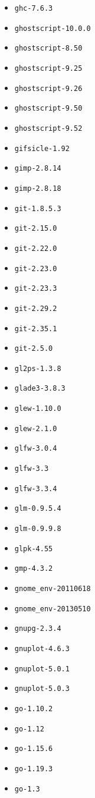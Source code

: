 \begin{multicols}{3}
\begin{itemize}
\item \verb|ghc-7.6.3|
\item \verb|ghostscript-10.0.0|
\item \verb|ghostscript-8.50|
\item \verb|ghostscript-9.25|
\item \verb|ghostscript-9.26|
\item \verb|ghostscript-9.50|
\item \verb|ghostscript-9.52|
\item \verb|gifsicle-1.92|
\item \verb|gimp-2.8.14|
\item \verb|gimp-2.8.18|
\item \verb|git-1.8.5.3|
\item \verb|git-2.15.0|
\item \verb|git-2.22.0|
\item \verb|git-2.23.0|
\item \verb|git-2.23.3|
\item \verb|git-2.29.2|
\item \verb|git-2.35.1|
\item \verb|git-2.5.0|
\item \verb|gl2ps-1.3.8|
\item \verb|glade3-3.8.3|
\item \verb|glew-1.10.0|
\item \verb|glew-2.1.0|
\item \verb|glfw-3.0.4|
\item \verb|glfw-3.3|
\item \verb|glfw-3.3.4|
\item \verb|glm-0.9.5.4|
\item \verb|glm-0.9.9.8|
\item \verb|glpk-4.55|
\item \verb|gmp-4.3.2|
\item \verb|gnome_env-20110618|
\item \verb|gnome_env-20130510|
\item \verb|gnupg-2.3.4|
\item \verb|gnuplot-4.6.3|
\item \verb|gnuplot-5.0.1|
\item \verb|gnuplot-5.0.3|
\item \verb|go-1.10.2|
\item \verb|go-1.12|
\item \verb|go-1.15.6|
\item \verb|go-1.19.3|
\item \verb|go-1.3|

\end{itemize}
\end{multicols}
